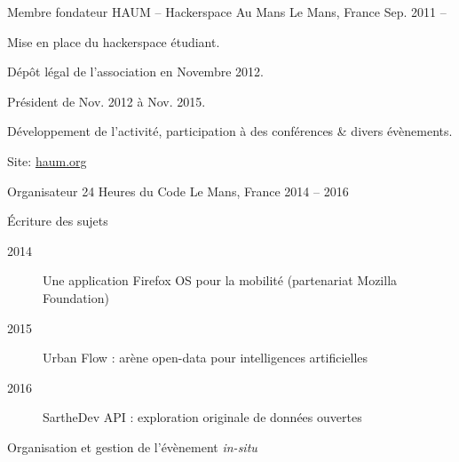 

\begin{cventries}

  \cventry
    {Membre fondateur} %
    {HAUM -- Hackerspace Au Mans} %
    {Le Mans, France} %
    {Sep. 2011 --} %
    {
      \begin{cvitems} %
        \item {Mise en place du hackerspace étudiant.}
				\item {Dépôt légal de l'association en Novembre 2012.}
        \item {Président de Nov. 2012 à Nov. 2015.}
				\item {Développement de l'activité, participation à des conférences \& divers évènements.}
				\item {Site: \href{https://haum.org}{haum.org}}
      \end{cvitems}
    }

  \cventry
    {Organisateur} %
    {24 Heures du Code} %
    {Le Mans, France} %
    {2014 -- 2016} %
    {
      \begin{cvitems} %
        \item {Écriture des sujets
					\begin{description}
						\item[2014] Une application Firefox OS pour la mobilité (partenariat Mozilla Foundation)
						\item[2015] Urban Flow : arène open-data pour intelligences artificielles
						\item[2016] SartheDev API : exploration originale de données ouvertes
					\end{description}
				}
				\item {Organisation et gestion de l'évènement \textit{in-situ}}
      \end{cvitems}
    }


\end{cventries}
